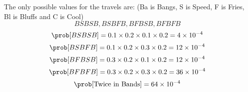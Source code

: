 The only possible values for the travels are: (Ba is Bangs, S is Speed, F is Fries, Bl is Bluffs and C is Cool)
$$
BSBSB, BSBFB, BFBSB, BFBFB
$$
$$
\prob[BSBSB] = 0.1\times0.2\times0.1\times0.2 = 4\times10^{-4}
$$
$$
\prob[BSBFB] = 0.1\times0.2\times0.3\times0.2 = 12\times10^{-4}
$$
$$
\prob[BFBSB] = 0.3\times0.2\times0.1\times0.2 = 12\times10^{-4}
$$
$$
\prob[BFBFB] = 0.3\times0.2\times0.3\times0.2 = 36\times10^{-4}
$$
$$
\prob[\text{Twice in Bands}] = 64\times10^{-4}
$$